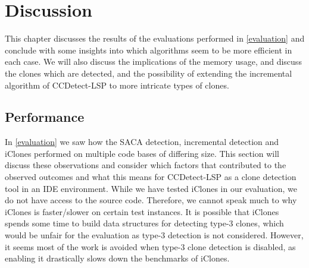 \chapter{Discussion}

This chapter discusses the results of the evaluations performed in \cref{evaluation} and
conclude with some insights into which algorithms seem to be more efficient in each case.
We will also discuss the implications of the memory usage, and discuss the clones which
are detected, and the possibility of extending the incremental algorithm of CCDetect-LSP
to more intricate types of clones.

\section{Performance}

In \cref{evaluation} we saw how the SACA detection, incremental detection and iClones
performed on multiple code bases of differing size. This section will discuss these
observations and consider which factors that contributed to the observed outcomes and what
this means for CCDetect-LSP as a clone detection tool in an IDE environment. While we have
tested iClones in our evaluation, we do not have access to the source code. Therefore, we
cannot speak much to why iClones is faster/slower on certain test instances. It is
possible that iClones spends some time to build data structures for detecting type-3
clones, which would be unfair for the evaluation as type-3 detection is not considered.
However, it seems most of the work is avoided when type-3 clone detection is disabled, as
enabling it drastically slows down the benchmarks of iClones.

